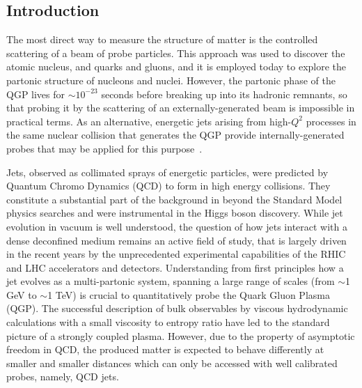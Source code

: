\subsection{Introduction}

The most direct way to measure the structure of matter is the controlled scattering of a beam of probe particles. This approach was used to discover the atomic nucleus, and quarks and gluons, and it is employed today to explore the partonic structure of nucleons and nuclei. However, the partonic phase of the QGP lives for $\sim10^{-23}$ seconds before breaking up into its hadronic remnants, so that probing it by the scattering of an externally-generated beam is impossible in practical terms. As an alternative, energetic jets arising from high-$Q^2$ processes in the same nuclear collision that generates the QGP provide internally-generated probes that may be applied for this purpose~\cite{Bjorken:1982tu,Gyulassy:1990ye,Baier:1994bd,Zakharov:2018rst,Gyulassy:1999zd,Wiedemann:2009sh}. 

Jets, observed as collimated sprays of energetic particles, were predicted by Quantum Chromo Dynamics (QCD) to form in high energy collisions. They constitute a substantial part of the background in beyond the Standard Model physics searches and were instrumental in the Higgs boson discovery. While jet evolution in vacuum is well understood, the question of how jets interact with a dense deconfined medium remains an active field of study, that is largely driven in the recent years by the unprecedented experimental capabilities of the RHIC and LHC accelerators and detectors.  Understanding from first principles how a jet evolves as a multi-partonic system, spanning a large range of scales (from  $\sim$1 GeV to $\sim$1 TeV) is crucial to quantitatively probe the Quark Gluon Plasma (QGP).  The successful description of bulk observables by viscous hydrodynamic calculations with a small viscosity to entropy ratio have led to the standard picture of a strongly coupled plasma. However, due to the property of asymptotic freedom in QCD, the produced matter is expected to behave differently at smaller and smaller distances which can only be accessed with well calibrated probes, namely, QCD jets.

